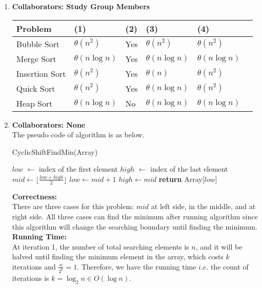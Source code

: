 \documentclass[a4paper,12pt]{article}
\begin{document}
\begin{enumerate}

\item { \textbf{Collaborators: Study Group Members} \\
\begin{center}
\begin{tabular}{ | m | m | m | m | m | m | } 
\hline
Problem & (1) & (2) & (3) & (4) \\
\hline
Bubble Sort & $\theta(n^2)$ & Yes & $\theta (n^2)$ & $\theta(n^2)$ \\ 
 \hline
 Merge Sort & $\theta(n\log n)$ & Yes & $\theta (n\log n)$ & $\theta(n\log n)$ \\ 
 \hline
 Insertion Sort & $\theta(n^2)$ & Yes & $\theta (n)$ & $\theta(n^2)$ \\ 
 \hline
 Quick Sort & $\theta(n^2)$ & Yes & $\theta (n\log n)$ & $\theta(n^2)$ \\ 
 \hline
 Heap Sort & $\theta(n\log n)$ & No & $\theta (n\log n)$ & $\theta(n\log n)$ \\ 
\hline
\end{tabular}
\end{center}

}

\item{ \textbf{Collaborators: None} \\ The pseudo code of algorithm is as below.
\begin{algorithm}
	\caption{CyclicShiftFindMin(Array)} 
	\begin{algorithmic}[1]
	    \State $low$ $\leftarrow$ index of the first element
	    \State $high$ $\leftarrow$ index of the last element
		    \State $mid \gets \lfloor \frac{low + high}{2} \rfloor$
		        \State $low \gets mid + 1$
		    \Else{}
		        \State $high \gets mid$
		    \EndIf
		\EndWhile
		\State \textbf{return} Array[$low$]
	\end{algorithmic} 
\end{algorithm}

\textbf{Correctness:} \\ There are three cases for this problem: $mid$ at left side, in the middle, and at right side. All three cases can find the minimum after running algorithm since this algorithm will change the searching boundary until finding the minimum. \\
\textbf{Running Time:} \\ At iteration 1, the number of total searching elements is $n$, and it will be halved until finding the minimum element in the array, which costs $k$ iterations and $\frac{n}{2^k} = 1$. Therefore, we have the running time $i.e.$ the count of iterations is $k = \log _2n \in O(\log n)$.

}
\end{enumerate}
\end{document}
